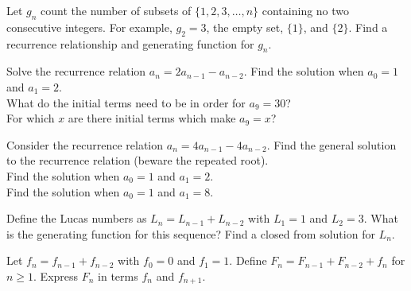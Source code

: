 \begin{exercise}
Let $g_n$ count the number of subsets of $\{1, 2, 3, \ldots, n\}$ containing no two consecutive integers.  For example, $g_2=3$, the empty set, $\{1\}$, and $\{2\}$.  Find a recurrence relationship and generating function for $g_n$.
\end{exercise}

\begin{exercise}
Solve the recurrence relation $a_n=2a_{n-1}-a_{n-2}$.
Find the solution when $a_0=1$ and $a_1=2$.\\
What do the initial terms need to be in order for $a_9=30$?\\
For which $x$ are there initial terms which make $a_9=x$?\\
\end{exercise}

\begin{exercise}
Consider the recurrence relation $a_n=4a_{n-1}-4a_{n-2}$.
Find the general solution to the recurrence relation (beware the repeated root).\\
Find the solution when $a_0=1$ and $a_1=2$.\\
Find the solution when $a_0=1$ and $a_1=8$.\\
\end{exercise}

\begin{exercise}
Define the Lucas numbers as $L_n=L_{n-1}+L_{n-2}$ with $L_1=1$ and $L_2=3$.  What is the generating function for this sequence? Find a closed from solution for $L_n$.
\end{exercise}




 

\begin{exercise}
Let $f_n=f_{n-1}+f_{n-2}$ with $f_0=0$ and $f_1=1$.  Define $F_n=F_{n-1}+F_{n-2}+ f_n$ for $n \ge 1$.  Express $F_n$ in terms $f_n$ and $f_{n+1}$.
\end{exercise}


